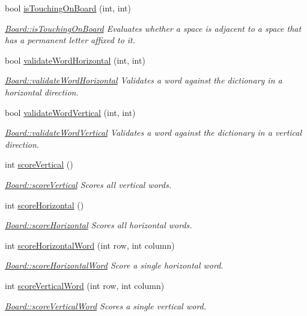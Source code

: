 \begin{DoxyCompactItemize}
bool \hyperlink{class_board_a4b992bdcd23d8b04b6719ebdffe61567}{is\-Touching\-On\-Board} (int, int)
\begin{DoxyCompactList}\small\item\em \hyperlink{class_board_a4b992bdcd23d8b04b6719ebdffe61567}{Board\-::is\-Touching\-On\-Board} Evaluates whether a space is adjacent to a space that has a permanent letter affixed to it. \end{DoxyCompactList}\item 
bool \hyperlink{class_board_a080fd46791ef19789fb414457bd416e4}{validate\-Word\-Horizontal} (int, int)
\begin{DoxyCompactList}\small\item\em \hyperlink{class_board_a080fd46791ef19789fb414457bd416e4}{Board\-::validate\-Word\-Horizontal} Validates a word against the dictionary in a horizontal direction. \end{DoxyCompactList}\item 
bool \hyperlink{class_board_adac7ae1684cc12ae8baa48cbae467285}{validate\-Word\-Vertical} (int, int)
\begin{DoxyCompactList}\small\item\em \hyperlink{class_board_adac7ae1684cc12ae8baa48cbae467285}{Board\-::validate\-Word\-Vertical} Validates a word against the dictionary in a vertical direction. \end{DoxyCompactList}\item 
int \hyperlink{class_board_a8bad7e1e83fcff71f3bb842d6bc72579}{score\-Vertical} ()
\begin{DoxyCompactList}\small\item\em \hyperlink{class_board_a8bad7e1e83fcff71f3bb842d6bc72579}{Board\-::score\-Vertical} Scores all vertical words. \end{DoxyCompactList}\item 
int \hyperlink{class_board_ab8c08852d5e3fcc2f8b923071742aae1}{score\-Horizontal} ()
\begin{DoxyCompactList}\small\item\em \hyperlink{class_board_ab8c08852d5e3fcc2f8b923071742aae1}{Board\-::score\-Horizontal} Scores all horizontal words. \end{DoxyCompactList}\item 
int \hyperlink{class_board_a434ba8c6b08da0602f0c56c5b4d02b4f}{score\-Horizontal\-Word} (int row, int column)
\begin{DoxyCompactList}\small\item\em \hyperlink{class_board_a434ba8c6b08da0602f0c56c5b4d02b4f}{Board\-::score\-Horizontal\-Word} Score a single horizontal word. \end{DoxyCompactList}\item 
int \hyperlink{class_board_ab4af62ad2cf8b8569af713b939237b10}{score\-Vertical\-Word} (int row, int column)
\begin{DoxyCompactList}\small\item\em \hyperlink{class_board_ab4af62ad2cf8b8569af713b939237b10}{Board\-::score\-Vertical\-Word} Scores a single vertical word. \end{DoxyCompactList}\end{DoxyCompactItemize}
